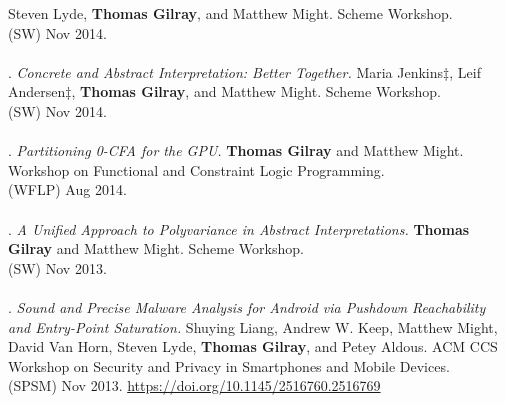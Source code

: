 Steven Lyde, \textbf{Thomas Gilray}, and Matthew Might.
Scheme Workshop.
\\(SW) Nov 2014.
\\ \vspace{-0.1cm}\\
\paper. \textit{Concrete and Abstract Interpretation: Better Together.}
Maria Jenkins$\ddagger$, Leif Andersen$\ddagger$, \textbf{Thomas Gilray}, and Matthew Might.
Scheme Workshop.
\\(SW) Nov 2014.
\\ \vspace{-0.1cm}\\
\paper. \textit{Partitioning 0-CFA for the GPU.}
\textbf{Thomas Gilray} and Matthew Might.
Workshop on Functional and Constraint Logic Programming.
\\(WFLP) Aug 2014.
\\ \vspace{-0.1cm}\\
\paper. \textit{A Unified Approach to Polyvariance in Abstract Interpretations.}
\textbf{Thomas Gilray} and Matthew Might.
Scheme Workshop.
\\(SW) Nov 2013.
\\ \vspace{-0.1cm}\\
\paper. \textit{Sound and Precise Malware Analysis for Android via Pushdown Reachability and Entry-Point Saturation.}
Shuying Liang, Andrew W. Keep, Matthew Might, David Van Horn, Steven Lyde, \textbf{Thomas Gilray}, and Petey Aldous.
ACM CCS Workshop on Security and Privacy in Smartphones and Mobile Devices.
\\(SPSM) Nov 2013. \url{https://doi.org/10.1145/2516760.2516769}
\\ \vspace{-0.1cm}\\
